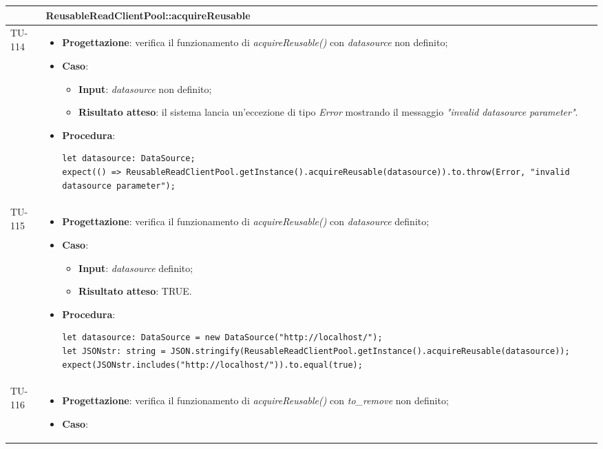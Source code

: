 \begin{longtable}{|C{1.5cm}|C{14.5cm}|}
\hline
{} & ReusableReadClientPool::acquireReusable
\\ \hline
{TU-114} &
\begin{itemize}
	\item \textbf{Progettazione}: verifica il funzionamento di \emph{acquireReusable()} con \emph{datasource} non definito;
	\item \textbf{Caso}: 
	\begin{itemize}
		\item \textbf{Input}: \emph{datasource} non definito;
		\item \textbf{Risultato atteso}: il sistema lancia un'eccezione di tipo \emph{Error} mostrando il messaggio \emph{"invalid datasource parameter"}.
	\end{itemize}
	\item \textbf{Procedura}:
	\begin{lstlisting}
let datasource: DataSource;
expect(() => ReusableReadClientPool.getInstance().acquireReusable(datasource)).to.throw(Error, "invalid datasource parameter");
	\end{lstlisting}
\end{itemize}\\
\hline
{TU-115} &
\begin{itemize}
	\item \textbf{Progettazione}: verifica il funzionamento di \emph{acquireReusable()} con \emph{datasource} definito;
	\item \textbf{Caso}: 
	\begin{itemize}
		\item \textbf{Input}: \emph{datasource} definito;
		\item \textbf{Risultato atteso}: TRUE.
	\end{itemize}
	\item \textbf{Procedura}:
	\begin{lstlisting}
let datasource: DataSource = new DataSource("http://localhost/");
let JSONstr: string = JSON.stringify(ReusableReadClientPool.getInstance().acquireReusable(datasource));
expect(JSONstr.includes("http://localhost/")).to.equal(true);
	\end{lstlisting}
\end{itemize}\\
\hline
{TU-116} &
\begin{itemize}
	\item \textbf{Progettazione}: verifica il funzionamento di \emph{acquireReusable()} con \emph{to\_remove} non definito;
	\item \textbf{Caso}: 

\end{itemize}
\end{longtable}
